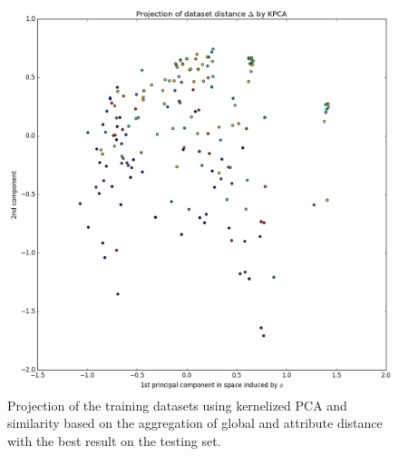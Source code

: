 
\begin{figure}	
	\includegraphics[width=14cm]{Images/kpcaDistance.png}
	\centering
	\caption{Projection of the training datasets using kernelized PCA and similarity based on the aggregation of global and attribute distance with the best result on the testing set.}	
	\label{fig:kpcaDistance}	
\end{figure}
 
